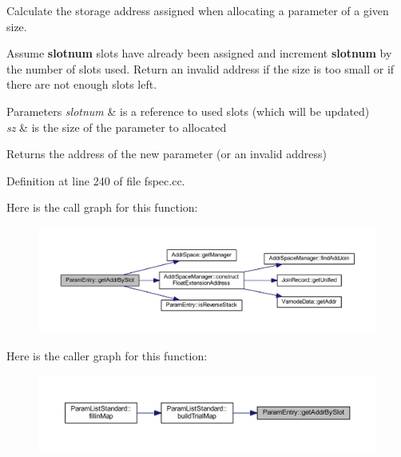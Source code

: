 Calculate the storage address assigned when allocating a parameter of a given size. 

Assume {\bfseries{slotnum}} slots have already been assigned and increment {\bfseries{slotnum}} by the number of slots used. Return an invalid address if the size is too small or if there are not enough slots left. 
\begin{DoxyParams}{Parameters}
{\em slotnum} & is a reference to used slots (which will be updated) \\
\hline
{\em sz} & is the size of the parameter to allocated \\
\hline
\end{DoxyParams}
\begin{DoxyReturn}{Returns}
the address of the new parameter (or an invalid address) 
\end{DoxyReturn}


Definition at line 240 of file fspec.\+cc.

Here is the call graph for this function\+:
\nopagebreak
\begin{figure}[H]
\begin{center}
\leavevmode
\includegraphics[width=350pt]{class_param_entry_afa742398e87fda08bc9cfaa69304c4be_cgraph}
\end{center}
\end{figure}
Here is the caller graph for this function\+:
\nopagebreak
\begin{figure}[H]
\begin{center}
\leavevmode
\includegraphics[width=350pt]{class_param_entry_afa742398e87fda08bc9cfaa69304c4be_icgraph}
\end{center}
\end{figure}
\mbox{\label{class_param_entry_a7366c85d2d63bc5a2495d8597b1f977a}} 
